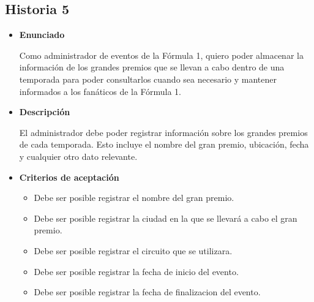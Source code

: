 \documentclass{article}
\begin{document}
	\subsection{Historia 5}
	\begin{itemize}
		
		\item \large{\textbf{Enunciado}}
		\begin{description}
Como administrador de eventos de la Fórmula 1, quiero poder almacenar la información de los grandes premios que se llevan a cabo dentro de una temporada para poder consultarlos cuando sea necesario y mantener informados a los fanáticos de la Fórmula 1.
		\end{description}
		
		\item \large{\textbf{Descripción}}
		\begin{description}
	El administrador debe poder registrar información sobre los grandes premios de cada temporada. Esto incluye el nombre del gran premio, ubicación, fecha y cualquier otro dato relevante.

		\end{description}
		
		\item \large{\textbf{Criterios de aceptación}}
		\begin{itemize}
			\item Debe ser posible registrar el nombre del gran premio.
			\item Debe ser posible registrar la ciudad en la que se llevará a cabo  el gran premio. 
			\item Debe ser posible registrar el circuito que se utilizara. 
			\item Debe ser posible registrar la fecha de inicio del evento. 
			\item Debe ser posible registrar la fecha de finalizacion del evento.
			
		\end{itemize}
		
	\end{itemize}
	
\end{document}
